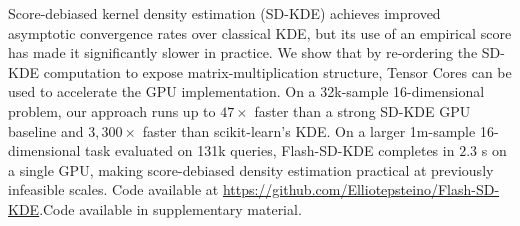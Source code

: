 Score-debiased kernel density estimation (SD-KDE) achieves improved asymptotic convergence rates over classical KDE, but its use of an empirical score has made it significantly slower in practice. 
We show that by re-ordering the SD-KDE computation to expose matrix-multiplication structure, Tensor Cores can be used to accelerate the GPU implementation. 
On a 32k-sample 16-dimensional problem, our approach runs up to $47\times$ faster than a strong SD-KDE GPU baseline and $3{,}300\times$ faster than scikit-learn's KDE. 
On a larger 1m-sample 16-dimensional task evaluated on 131k queries, Flash-SD-KDE completes in $2.3$ s on a single GPU, making score-debiased density estimation practical at previously infeasible scales.
\ifarxiv Code available at \url{https://github.com/Elliotepsteino/Flash-SD-KDE}.\else Code available in supplementary material.\fi
